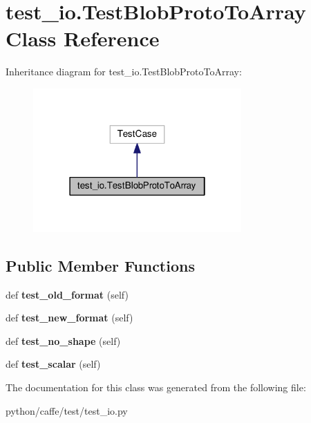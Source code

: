 \hypertarget{classtest__io_1_1_test_blob_proto_to_array}{}\section{test\+\_\+io.\+Test\+Blob\+Proto\+To\+Array Class Reference}
\label{classtest__io_1_1_test_blob_proto_to_array}


Inheritance diagram for test\+\_\+io.\+Test\+Blob\+Proto\+To\+Array\+:
\nopagebreak
\begin{figure}[H]
\begin{center}
\leavevmode
\includegraphics[width=226pt]{classtest__io_1_1_test_blob_proto_to_array__inherit__graph}
\end{center}
\end{figure}
\subsection*{Public Member Functions}
\begin{DoxyCompactItemize}
\item 
\mbox{\label{classtest__io_1_1_test_blob_proto_to_array_a7bc9afb9e6def69a39b57e42c90442a7}} 
def {\bfseries test\+\_\+old\+\_\+format} (self)
\item 
\mbox{\label{classtest__io_1_1_test_blob_proto_to_array_ae55c84f7e68126dde54c239f372ce6bf}} 
def {\bfseries test\+\_\+new\+\_\+format} (self)
\item 
\mbox{\label{classtest__io_1_1_test_blob_proto_to_array_a205b7f9ab9b47bbed90a843b5f4c15fe}} 
def {\bfseries test\+\_\+no\+\_\+shape} (self)
\item 
\mbox{\label{classtest__io_1_1_test_blob_proto_to_array_aa47e8b5105cd9ca1f2a7ff889923fb1a}} 
def {\bfseries test\+\_\+scalar} (self)
\end{DoxyCompactItemize}


The documentation for this class was generated from the following file\+:\begin{DoxyCompactItemize}
\item 
python/caffe/test/test\+\_\+io.\+py\end{DoxyCompactItemize}
